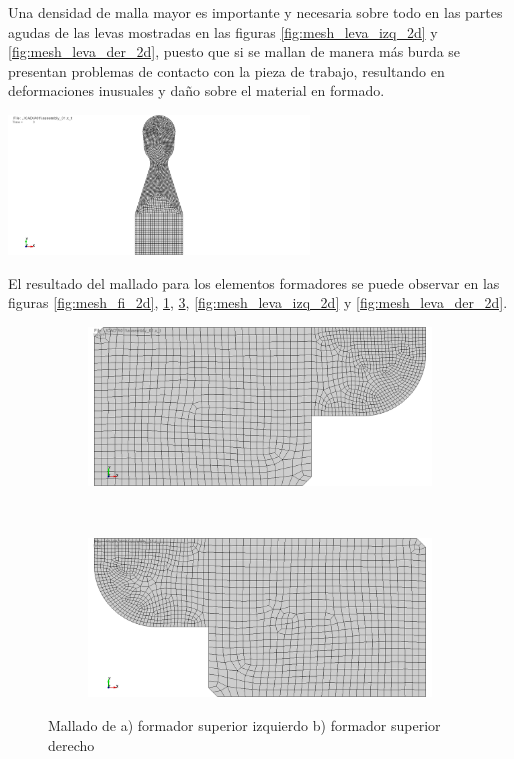 Una densidad de malla mayor es importante y necesaria sobre todo en las partes agudas de las levas mostradas en 
las figuras \ref{fig:mesh_leva_izq_2d} y \ref{fig:mesh_leva_der_2d}, puesto que si se mallan de manera más burda 
se presentan problemas de contacto con la pieza de trabajo, resultando en deformaciones inusuales y daño sobre 
el material en formado.

\begin{center}
\includegraphics[width=0.60\textwidth]{src/ch3/mesh_fi_2d.png}
\label{fig:mesh_fi_2d}
\end{center}

El resultado del mallado para los elementos formadores se puede observar en las figuras \ref{fig:mesh_fi_2d}, 
\ref{fig:mesh_fs_izq_2d}, \ref{fig:mesh_fs_der_2d}, \ref{fig:mesh_leva_izq_2d} y \ref{fig:mesh_leva_der_2d}.

\begin{figure}[H]
\centering
\begin{subfigure}[t]{0.4\textwidth}
	\centering
	\includegraphics[width=\textwidth]{src/ch3/mesh_fs_izq_2d.png}
	\caption{}
	\label{fig:mesh_fs_izq_2d}
\end{subfigure}
~
\begin{subfigure}[t]{0.4\textwidth}
	\centering
	\includegraphics[width=\textwidth]{src/ch3/mesh_fs_der_2d.png}
	\caption{}
	\label{fig:mesh_fs_der_2d}
\end{subfigure}
\caption{Mallado de a) formador superior izquierdo b) formador superior derecho}
\end{figure}


